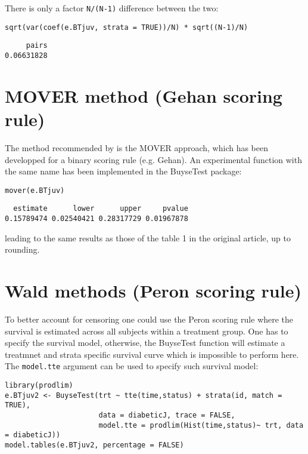 \documentclass[12pt]{article}
\begin{document}
There is only a factor \texttt{N/(N-1)} difference between the two:
\lstset{language=r,label= ,caption= ,captionpos=b,numbers=none}
\begin{lstlisting}
sqrt(var(coef(e.BTjuv, strata = TRUE))/N) * sqrt((N-1)/N)
\end{lstlisting}

\begin{verbatim}
     pairs 
0.06631828
\end{verbatim}


\section{MOVER method (Gehan scoring rule)}
\label{sec:org08560f3}

The method recommended by \cite{matsouaka2022robust} is the MOVER
approach, which has been developped for a binary scoring rule
(e.g. Gehan). An experimental function with the same name has been
implemented in the BuyseTest package:

\lstset{language=r,label= ,caption= ,captionpos=b,numbers=none}
\begin{lstlisting}
mover(e.BTjuv)
\end{lstlisting}
\begin{verbatim}
  estimate      lower      upper     pvalue 
0.15789474 0.02540421 0.28317729 0.01967878
\end{verbatim}


leading to the same results as those of the table 1 in the original article, up to rounding.

\clearpage

\section{Wald methods (Peron scoring rule)}
\label{sec:orga4d0a94}

To better account for censoring one could use the Peron scoring rule
where the survival is estimated across all subjects within a treatment
group. One has to specify the survival model, otherwise, the BuyseTest
function will estimate a treatmnet and strata specific survival curve
which is impossible to perform here. The \texttt{model.tte} argument can be
used to specify such survival model:
\lstset{language=r,label= ,caption= ,captionpos=b,numbers=none}
\begin{lstlisting}
library(prodlim)
e.BTjuv2 <- BuyseTest(trt ~ tte(time,status) + strata(id, match = TRUE), 
                      data = diabeticJ, trace = FALSE,
                      model.tte = prodlim(Hist(time,status)~ trt, data = diabeticJ))
model.tables(e.BTjuv2, percentage = FALSE)
\end{lstlisting}
\end{document}
